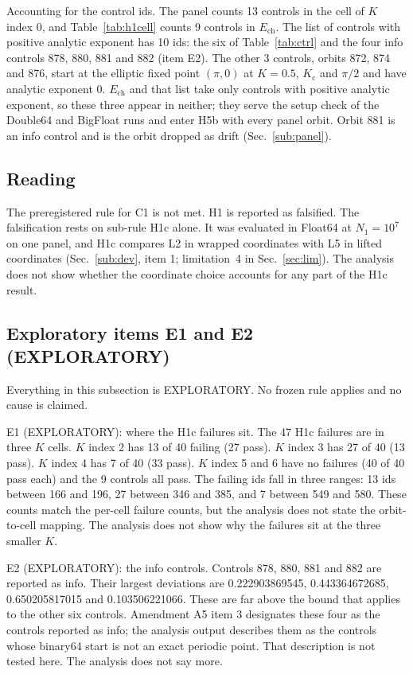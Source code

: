 \documentclass[aip,cha,reprint,amsmath,amssymb,longbibliography]{revtex4-2}
\newcommand{\tenp}[1]{\ensuremath{10^{#1}}}
\newcommand{\Ech}{\ensuremath{E_{\mathrm{ch}}}}
\newcommand{\Kc}{\ensuremath{K_{\mathrm{c}}}}
\newcommand{\Sec}[1]{Sec.~\ref{#1}}
\begin{document}
Accounting for the control ids.
The panel counts 13 controls in the cell of $K$ index 0, and Table~\ref{tab:h1cell} counts 9 controls in $\Ech$.
The list of controls with positive analytic exponent has 10 ids: the six of Table~\ref{tab:ctrl} and the four info controls 878, 880, 881 and 882 (item E2).
The other 3 controls, orbits 872, 874 and 876, start at the elliptic fixed point $(\pi,0)$ at $K=0.5$, $\Kc$ and $\pi/2$ and have analytic exponent 0.
$\Ech$ and that list take only controls with positive analytic exponent, so these three appear in neither; they serve the setup check of the Double64 and BigFloat runs and enter H5b with every panel orbit.
Orbit 881 is an info control and is the orbit dropped as drift (\Sec{sub:panel}).

\subsection{Reading}
\label{sub:h1read}

The preregistered rule for C1 is not met.
H1 is reported as falsified.
The falsification rests on sub-rule H1c alone.
It was evaluated in Float64 at $N_1=$\tenp{7} on one panel, and H1c compares L2 in wrapped coordinates with L5 in lifted coordinates (\Sec{sub:dev}, item 1; limitation~4 in \Sec{sec:lim}).
The analysis does not show whether the coordinate choice accounts for any part of the H1c result.

\subsection{Exploratory items E1 and E2 (EXPLORATORY)}
\label{sub:h1exp}

Everything in this subsection is EXPLORATORY.
No frozen rule applies and no cause is claimed.

E1 (EXPLORATORY): where the H1c failures sit.
The 47 H1c failures are in three $K$ cells.
$K$ index 2 has 13 of 40 failing (27 pass).
$K$ index 3 has 27 of 40 (13 pass).
$K$ index 4 has 7 of 40 (33 pass).
$K$ index 5 and 6 have no failures (40 of 40 pass each) and the 9 controls all pass.
The failing ids fall in three ranges: 13 ids between 166 and 196, 27 between 346 and 385, and 7 between 549 and 580.
These counts match the per-cell failure counts, but the analysis does not state the orbit-to-cell mapping.
The analysis does not show why the failures sit at the three smaller $K$.

E2 (EXPLORATORY): the info controls.
Controls 878, 880, 881 and 882 are reported as info.
Their largest deviations are 0.222903869545, 0.443364672685, 0.650205817015 and 0.103506221066.
These are far above the bound that applies to the other six controls.
Amendment A5 item 3 designates these four as the controls reported as info; the analysis output describes them as the controls whose binary64 start is not an exact periodic point.
That description is not tested here.
The analysis does not say more.
\end{document}
